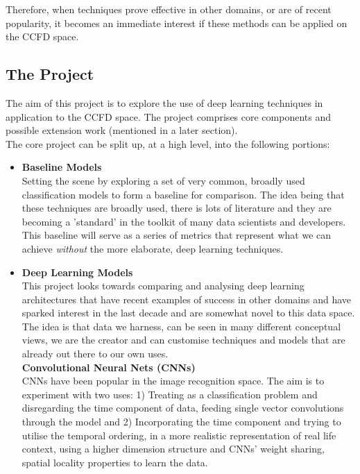 \documentclass[12pt,a4paper,twoside]{article}
\begin{document}
Therefore, when techniques prove effective in other domains, or are of recent popularity, it becomes an immediate interest if these methods can be applied on the CCFD space.

 \subsection*{The Project}
 The aim of this project is to explore the use of deep learning techniques in application to the CCFD space. The project comprises core components and possible extension work (mentioned in a later section).\\
 
 The core project can be split up, at a high level, into the following portions:
 \begin{itemize}
\item
	\textbf{Baseline Models} \\
	Setting the scene by exploring a set of very common, broadly used classification models to form a baseline for comparison. The idea being that these techniques are broadly used, there is lots of literature and they are becoming a 'standard' in the toolkit of many data scientists and developers. This baseline will serve as a series of metrics that represent what we can achieve \textit{without} the more elaborate, deep learning techniques. 
	
\item
	\textbf{Deep Learning Models}\\
	This project looks towards comparing and analysing deep learning architectures that have recent examples of success in other domains and have sparked interest in the last decade and are somewhat novel to this data space. The idea is that data we harness, can be seen in many different conceptual views, we are the creator and can customise techniques and models that are already out there to our own uses.\\ 

	\textbf{Convolutional Neural Nets (CNNs) \cite{DBLP:journals/corr/SimonyanZ14a}} \\
	CNNs have been popular in the image recognition space. The aim is to experiment with two uses: 1) Treating as a classification problem and disregarding the time component of data, feeding single vector convolutions through the model and 2) Incorporating the time component and trying to utilise the temporal ordering, in a more realistic representation of real life context, using a higher dimension structure and CNNs' weight sharing, spatial locality properties to learn the data.\\


\end{itemize}
\end{document}
